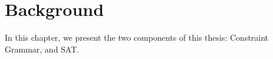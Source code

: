 \chapter{Background}

In this chapter, we present the two components of this thesis: Constraint Grammar, and SAT.



